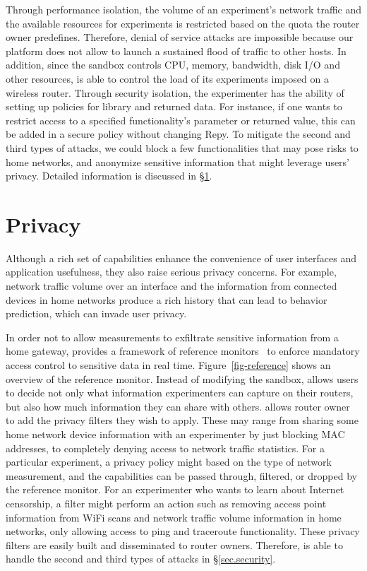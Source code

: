 Through performance isolation, the volume of an experiment's network traffic and the available resources for experiments is restricted based on the quota the router owner predefines. Therefore, denial of service attacks are impossible because our platform does not allow to launch a sustained flood of traffic to other hosts. In addition, since the sandbox controls CPU, memory, bandwidth, disk I/O and other resources, \sysname is able to control the load of its experiments imposed on a wireless router. Through security isolation, the experimenter has the ability of setting up policies for library and returned data. For instance, if one wants to restrict access to a specified functionality's parameter or returned value, this can be added in a secure policy without changing Repy. To mitigate the second and third types of attacks, we could block a few functionalities that may pose risks to home networks, and anonymize sensitive information that might leverage users' privacy. Detailed information is discussed in \S{\ref{sec.privacy}}. 

\section{Privacy}
\label{sec.privacy}
Although a rich set of capabilities enhance the convenience of user interfaces and application usefulness, they also raise serious privacy concerns. For example, network traffic volume over an interface and the information from connected devices in home networks produce a rich history that can lead to behavior prediction, which can invade user privacy. 

In order not to allow measurements to exfiltrate sensitive information from a home gateway, \sysname provides a framework of reference monitors~\cite{ref} to enforce mandatory access control to sensitive data in real time. Figure~\ref{fig-reference} shows an overview of the reference monitor. Instead of modifying the sandbox, \sysname allows users to decide not only what information experimenters can capture on their routers, but also how much information they can share with others. \sysname allows router owner to add the privacy filters they wish to apply. These may range from sharing some home network device information with an experimenter by just blocking MAC addresses, to completely denying access to network traffic statistics. For a particular experiment, a privacy policy might based on the type of network measurement, and the capabilities can be passed through, filtered, or dropped by the reference monitor. For an experimenter who wants to learn about Internet censorship, a filter might perform an action such as removing access point information from WiFi scans and network traffic volume information in home networks, only allowing access to ping and traceroute functionality. These privacy filters are easily built and disseminated to router owners. Therefore, \sysname is able to handle the second and third types of attacks in \S{\ref{sec.security}}. 

